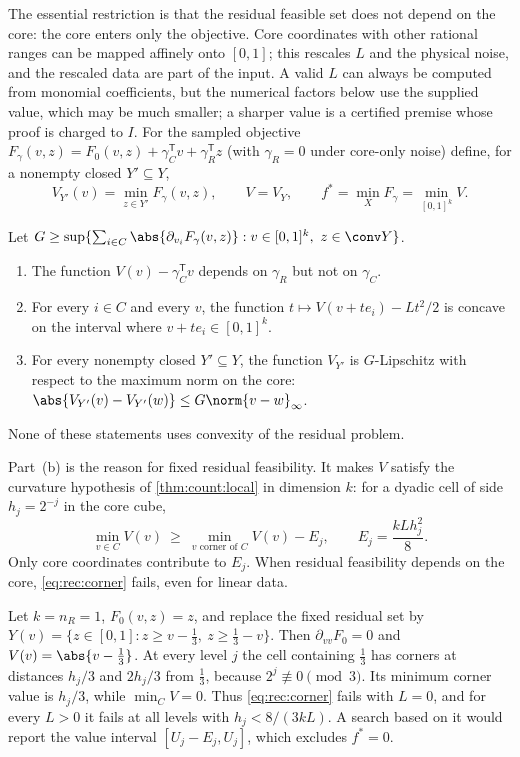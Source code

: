 The essential restriction is that the residual feasible set does not depend
on the core: the core enters only the objective. Core coordinates with other
rational ranges can be mapped affinely onto $[0,1]$; this rescales $L$ and
the physical noise, and the rescaled data are part of the input. A valid $L$
can always be computed from monomial coefficients, but the numerical factors
below use the supplied value, which may be much smaller; a sharper value is
a certified premise whose proof is charged to $I$. For the sampled
objective $F_\gamma(v,z)=F_0(v,z)+\gamma_C^{\mathsf T}v+\gamma_R^{\mathsf T}z$
(with $\gamma_R=0$ under core-only noise) define, for a nonempty closed
$Y'\subseteq Y$,
\begin{equation}\label{eq:rec:V}
 V_{Y'}(v)=\min_{z\in Y'}F_\gamma(v,z),\qquad V=V_Y,\qquad
 f^*=\min_XF_\gamma=\min_{[0,1]^k}V.
\end{equation}

\begin{lemma}\label{lem:rec:value}
Let $G\ge\sup\{\sum_{i\in C}\abs{\partial_{v_i}F_\gamma(v,z)}:
v\in[0,1]^k,\ z\in\conv Y\}$.
\begin{enumerate}[label=(\alph*)]
\item The function $V(v)-\gamma_C^{\mathsf T}v$ depends on $\gamma_R$ but not
on $\gamma_C$.
\item For every $i\in C$ and every $v$, the function
$t\mapsto V(v+te_i)-Lt^2/2$ is concave on the interval where
$v+te_i\in[0,1]^k$.
\item For every nonempty closed $Y'\subseteq Y$, the function $V_{Y'}$ is
$G$-Lipschitz with respect to the maximum norm on the core:
$\abs{V_{Y'}(v)-V_{Y'}(w)}\le G\norm{v-w}_\infty$.
\end{enumerate}
None of these statements uses convexity of the residual problem.
\end{lemma}

Part~(b) is the reason for fixed residual feasibility. It makes $V$ satisfy
the curvature hypothesis of \cref{thm:count:local} in dimension $k$: for a
dyadic cell of side $h_j=2^{-j}$ in the core cube,
\begin{equation}\label{eq:rec:corner}
 \min_{v\in C}V(v)\ \ge\ \min_{v\text{ corner of }C}V(v)-E_j,
 \qquad E_j=\frac{kLh_j^2}8 .
\end{equation}
Only core coordinates contribute to $E_j$. When residual feasibility depends
on the core, \eqref{eq:rec:corner} fails, even for linear data.

\begin{example}\label{ex:rec:feasibility}
Let $k=n_R=1$, $F_0(v,z)=z$, and replace the fixed residual set by
$Y(v)=\{z\in[0,1]:z\ge v-\frac13,\ z\ge\frac13-v\}$. Then $\partial_{vv}F_0=0$
and $V(v)=\abs{v-\frac13}$. At every level $j$ the cell containing $\frac13$
has corners at distances $h_j/3$ and $2h_j/3$ from $\frac13$, because
$2^j\not\equiv0\pmod3$. Its minimum corner value is $h_j/3$, while
$\min_CV=0$. Thus \eqref{eq:rec:corner} fails with $L=0$, and for every
$L>0$ it fails at all levels with $h_j<8/(3kL)$. A search based on it would
report the value interval $[U_j-E_j,U_j]$, which excludes $f^*=0$.
\end{example}

